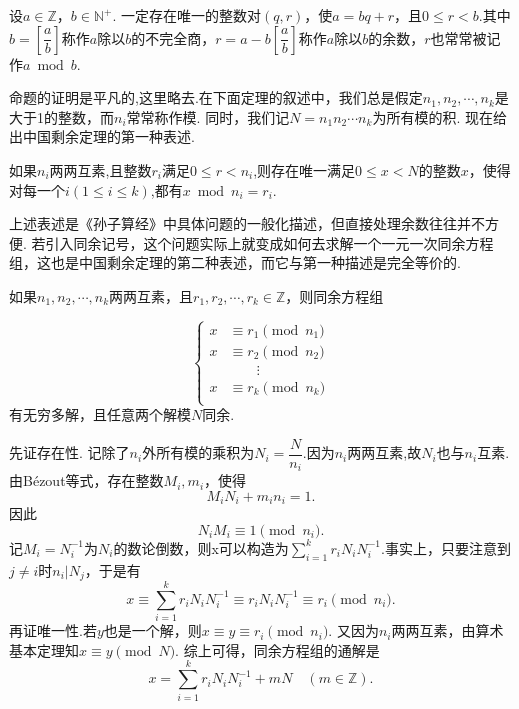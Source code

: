 \documentclass[color=green,mathpazo,titlestyle=hang]{elegantbook}
\begin{document}
  
\begin{newprop}[带余除法]
  设$a\in \mathbb{Z}$，$b\in \mathbb{N^+}$.	一定存在唯一的整数对$(q,r)$，使$a=bq+r$，且$0\leq r< b$.其中$b=\left[\dfrac{a}{b}\right]$称作$a$除以$b$的不完全商，$r=a-b\left[\dfrac{a}{b}\right]$称作$a$除以$b$的余数，$r$也常常被记作$a\bmod b$.
\end{newprop} 


\newpage

  命题的证明是平凡的,这里略去.在下面定理的叙述中，我们总是假定$n_1,n_2,\cdots,n_k$是大于1的整数，而$n_i$常常称作模. 同时，我们记$N=n_1n_2\cdots n_k$为所有模的积. 现在给出中国剩余定理的第一种表述.
  
  
  \begin{newthem}[中国剩余定理I]
  	如果$n_i$两两互素,且整数$r_i$满足$0\leq r< n_i$,则存在唯一满足$0\leq x <N$的整数$x$，使得对每一个$i(1\leq i \leq k)$,都有$x\bmod n_i=r_i$.
  \end{newthem}

  上述表述是《孙子算经》中具体问题的一般化描述，但直接处理余数往往并不方便. 若引入同余记号，这个问题实际上就变成如何去求解一个一元一次同余方程组，这也是中国剩余定理的第二种表述，而它与第一种描述是完全等价的.
  
  \begin{newthem}[中国剩余定理II]
  	如果$n_1,n_2,\cdots,n_k$两两互素，且$r_1,r_2,\cdots,r_k \in \mathbb{Z}$，则同余方程组
  
  	\begin{equation*}
  	\left\{                          
  	\begin{aligned}
  	x&\equiv r_1\pmod{n_1}\\
  	x&\equiv r_2\pmod{n_2}\\
  	 &\qquad \vdots\\ 
  	x&\equiv r_k\pmod{n_k}\\
  	\end{aligned}
  	\right.
  	\end{equation*}
  有无穷多解，且任意两个解模$N$同余.	
  
  \end{newthem}


  \begin{newproof}
	先证存在性. 记除了$n_i$外所有模的乘积为$N_i=\dfrac{N}{n_i}$.因为$n_i$两两互素,故$N_i$也与$n_i$互素.由B\'{e}zout等式，存在整数$M_i,m_i$，使得
	\[
	M_iN_i+m_in_i=1.
	\]
	因此
	\[
	N_iM_i\equiv 1\pmod{n_i}.
	\]
	记$M_i=N_i^{-1}$为$N_i$的数论倒数，则x可以构造为$\sum\limits_{i=1}^{k}r_iN_i N_i^{-1}$.事实上，只要注意到$j\ne i$时$n_i|N_j$，于是有
	\[
	x\equiv \sum_{i=1}^{k}r_iN_{i} N_i^{-1}\equiv r_iN_i N_i^{-1}\equiv r_i\pmod{n_i}.
	\]
	再证唯一性.若$y$也是一个解，则$x\equiv y\equiv r_i\pmod{n_i}$. 又因为$n_i$两两互素，由算术基本定理知$x\equiv y\pmod{N}$.
	综上可得，同余方程组的通解是
	\[
		x=\sum_{i=1}^{k}r_iN_i N_i^{-1}+mN \quad (m\in\mathbb{Z}).
	\]
  \end{newproof}
\end{document}
